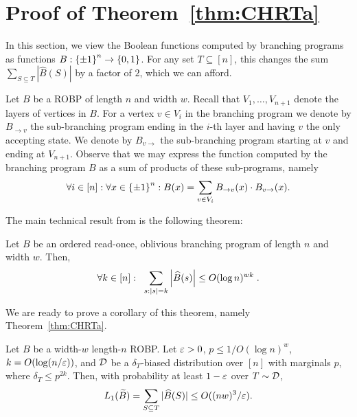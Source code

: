 \appendix
\section{Proof of Theorem~\ref{thm:CHRTa}}
\label{app:CHRT}


In this section, we view the Boolean functions computed by branching programs as functions $B: {\{\pm1\}}^n \to {\{0,1\}}$. For any set $T \subseteq [n]$, this changes the sum $\sum_{S \subseteq T}{|\hat{B}(S)|}$ by a factor of $2$, which we can afford.

Let $B$ be a ROBP of length $n$ and width $w$. Recall that $V_1, \ldots, V_{n+1}$ denote the layers of vertices in $B$.
For a vertex $v \in V_i$ in the branching program we denote by $B_{\to v}$ the sub-branching program ending in the $i$-th layer and having  $v$ the only accepting state.
We denote by $B_{v \to}$ the sub-branching program starting at $v$ and ending at $V_{n+1}$.
Observe that we may express the function computed by the branching program $B$ as a sum of products of these sub-programs, namely 
\begin{equation}\label{eq:bp-decomposition}
\forall{i\in[n]}: \forall{x\in {\{\pm1\}}^n}: B(x) = \sum_{v\in V_i}{B_{\to v}(x) \cdot B_{v \to}(x)}.	
\end{equation}

The main technical result from \cite{CHRT17} is the following theorem:
\begin{theorem}\label{thm:main_fourier} Let $B$ be an ordered read-once, oblivious branching program of length $n$ and width $w$. Then, 
	$$\forall{k\in [n]}: \;\;\sum_{s: |s|=k} \left|\widehat{B}(s)\right| 
	\le 
	O(\log n)^{wk}\;.$$
	\end{theorem}

We are ready to prove a corollary of this theorem, namely Theorem~\ref{thm:CHRTa}.

\begin{theorem}
Let $B$ be a width-$w$ length-$n$ ROBP. Let $\varepsilon>0$, $p \le 1/O(\log n)^w$, $k = O(\log(n/\varepsilon))$, and ${\mathcal{D}}$ be a $\delta_T$-biased distribution over $[n]$ with marginals $p$, where $\delta_T \le p^{2k}$.
Then,
with probability at least $1-\varepsilon$ over $T\sim {\mathcal{D}}$, 
\[L_1(\widetilde{B}) =  \sum_{S \subseteq T}{ |\widehat{B}(S)|} \le O((nw)^3/\varepsilon).\]
\end{theorem}

